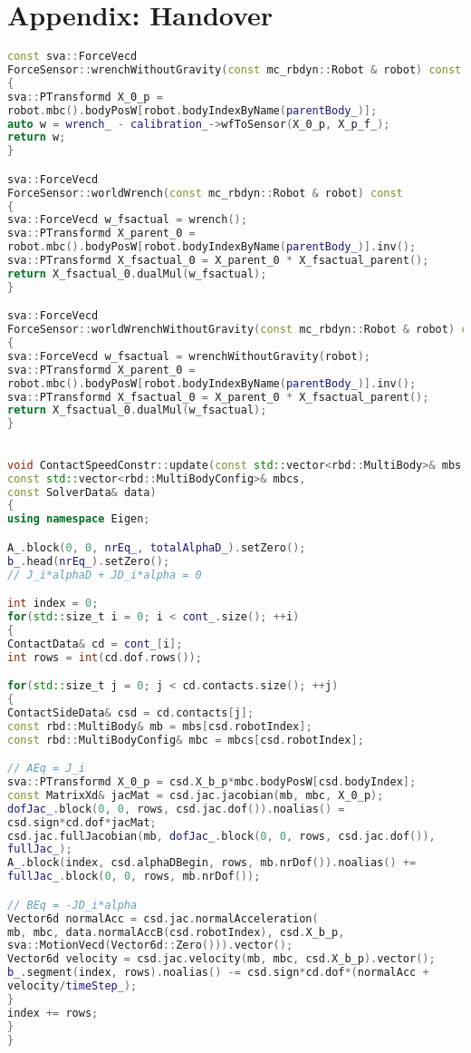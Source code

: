 \chapter{Appendix: Handover}

\begin{lstlisting}[language=C++,basicstyle=\footnotesize, caption={wrench}]
const sva::ForceVecd 
ForceSensor::wrenchWithoutGravity(const mc_rbdyn::Robot & robot) const
{
sva::PTransformd X_0_p = 
robot.mbc().bodyPosW[robot.bodyIndexByName(parentBody_)];
auto w = wrench_ - calibration_->wfToSensor(X_0_p, X_p_f_);
return w;
}

sva::ForceVecd 
ForceSensor::worldWrench(const mc_rbdyn::Robot & robot) const
{
sva::ForceVecd w_fsactual = wrench();
sva::PTransformd X_parent_0 = 
robot.mbc().bodyPosW[robot.bodyIndexByName(parentBody_)].inv();
sva::PTransformd X_fsactual_0 = X_parent_0 * X_fsactual_parent();
return X_fsactual_0.dualMul(w_fsactual);
}

sva::ForceVecd 
ForceSensor::worldWrenchWithoutGravity(const mc_rbdyn::Robot & robot) const
{
sva::ForceVecd w_fsactual = wrenchWithoutGravity(robot);
sva::PTransformd X_parent_0 = 
robot.mbc().bodyPosW[robot.bodyIndexByName(parentBody_)].inv();
sva::PTransformd X_fsactual_0 = X_parent_0 * X_fsactual_parent();
return X_fsactual_0.dualMul(w_fsactual);
}
\end{lstlisting}




\begin{lstlisting}[language=C++,basicstyle=\footnotesize, caption={QPContactConstr}]

void ContactSpeedConstr::update(const std::vector<rbd::MultiBody>& mbs,
const std::vector<rbd::MultiBodyConfig>& mbcs,
const SolverData& data)
{
using namespace Eigen;

A_.block(0, 0, nrEq_, totalAlphaD_).setZero();
b_.head(nrEq_).setZero();
// J_i*alphaD + JD_i*alpha = 0

int index = 0;
for(std::size_t i = 0; i < cont_.size(); ++i)
{
ContactData& cd = cont_[i];
int rows = int(cd.dof.rows());

for(std::size_t j = 0; j < cd.contacts.size(); ++j)
{
ContactSideData& csd = cd.contacts[j];
const rbd::MultiBody& mb = mbs[csd.robotIndex];
const rbd::MultiBodyConfig& mbc = mbcs[csd.robotIndex];

// AEq = J_i
sva::PTransformd X_0_p = csd.X_b_p*mbc.bodyPosW[csd.bodyIndex];
const MatrixXd& jacMat = csd.jac.jacobian(mb, mbc, X_0_p);
dofJac_.block(0, 0, rows, csd.jac.dof()).noalias() =
csd.sign*cd.dof*jacMat;
csd.jac.fullJacobian(mb, dofJac_.block(0, 0, rows, csd.jac.dof()),
fullJac_);
A_.block(index, csd.alphaDBegin, rows, mb.nrDof()).noalias() +=
fullJac_.block(0, 0, rows, mb.nrDof());

// BEq = -JD_i*alpha
Vector6d normalAcc = csd.jac.normalAcceleration(
mb, mbc, data.normalAccB(csd.robotIndex), csd.X_b_p,
sva::MotionVecd(Vector6d::Zero())).vector();
Vector6d velocity = csd.jac.velocity(mb, mbc, csd.X_b_p).vector();
b_.segment(index, rows).noalias() -= csd.sign*cd.dof*(normalAcc +
velocity/timeStep_);
}
index += rows;
}
}
\end{lstlisting}
